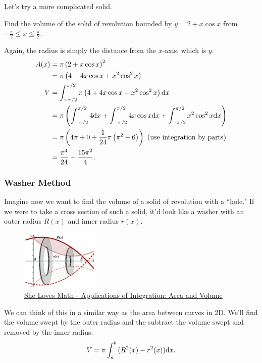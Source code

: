 \noindent
Let's try a more complicated solid.
\begin{example}
	Find the volume of the solid of revolution bounded by $y=2+x\cos{x}$ from $-\frac{\pi}{2} \leq x \leq \frac{\pi}{2}$.
\end{example}
Again, the radius is simply the distance from the $x$-axis, which is $y$.
\begin{align*}
	A(x) &= \pi \left(2+x\cos{x}\right)^2 \\
	&= \pi \left(4 + 4x\cos{x} + x^2\cos^2{x}\right) \\
	V &= \int_{-\pi/2}^{\pi/2}{\pi \left(4 + 4x\cos{x} + x^2\cos^2{x}\right)\mathrm{d} x} \\
	&= \pi\left(\int_{-\pi/2}^{\pi/2}{4\mathrm{d} x}+\int_{-\pi/2}^{\pi/2}{4x\cos{x}\mathrm{d} x}+\int_{-\pi/2}^{\pi/2}{x^2\cos^2{x}\mathrm{d} x}\right) \\
	&= \pi\left(4\pi + 0 + \frac{1}{24}\pi\left(\pi^2-6\right)\right) \text{ (use integration by parts)}\\
	&= \frac{\pi^4}{24} + \frac{15\pi^2}{4}.
\end{align*}

\subsubsection{Washer Method}
Imagine now we want to find the volume of a solid of revolution with a ``hole."
If we were to take a cross section of such a solid, it'd look like a washer with an outer radius $R(x)$ and inner radius $r(x)$.

\begin{figure}[H]
	\label{washers}
	\centering
	\includegraphics[width=0.33\textwidth]{./applications_integrals/Washer-1.png}
	\caption{\hyperref{https://www.shelovesmath.com/calculus/integral-calculus/applications-integration-area-volume/}{}{}{She Loves Math - Applications of Integration: Area and Volume}}
\end{figure}

\noindent
We can think of this in a similar way as the area between curves in 2D.
We'll find the volume swept by the outer radius and the subtract the volume swept and removed by the inner radius.
\begin{equation*}
	V = \pi\int_{a}^{b}{(R^2(x)-r^2(x))\mathrm{d} x}.
\end{equation*}

